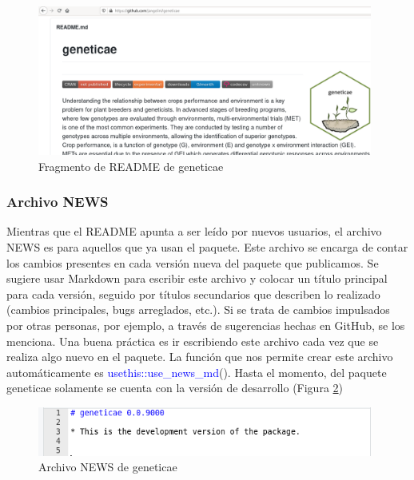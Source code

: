 \begin{figure}[H]
	\begin{center}
		\includegraphics[width=11cm]{./Graficos/badges.png}	
	\end{center}
	\caption{Fragmento de README de geneticae}
	\label{fig:fig36}
\end{figure}




\subsubsection{Archivo NEWS}


Mientras que el README apunta a ser leído por nuevos usuarios, el archivo NEWS es para aquellos que ya usan el paquete.
Este archivo se encarga de contar los cambios presentes en cada versión nueva del paquete que publicamos.
Se sugiere usar Markdown para escribir este archivo y colocar un título principal para cada versión, seguido por títulos secundarios que describen lo realizado (cambios principales, bugs arreglados, etc.).
Si se trata de cambios impulsados por otras personas, por ejemplo, a través de sugerencias hechas en GitHub, se los menciona.
Una buena práctica es ir escribiendo este archivo cada vez que se realiza algo nuevo en el paquete.
La función que nos permite crear este archivo automáticamente es
\textcolor{blue}{usethis::use\_news\_md}(). Hasta el momento, del paquete geneticae solamente se cuenta con la versión de desarrollo (Figura \ref{fig:fig37}) 



\begin{figure}[H]
	\begin{center}
		\includegraphics[width=11cm]{./Graficos/News.png}	
	\end{center}
	\caption{Archivo NEWS de geneticae}
	\label{fig:fig37}
\end{figure}





